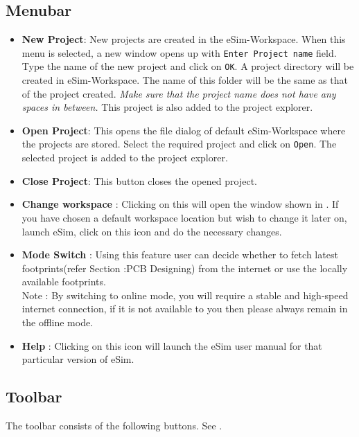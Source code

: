 \subsection{Menubar}
\begin{itemize}
\item \textbf{New Project}:
New projects are created in the eSim-Workspace. When this menu is selected, 
a new window opens up with {\tt Enter Project name} field. Type the name of 
the new project and click on {\tt OK}. A project directory will be created in 
eSim-Workspace. The name of this folder will be the same as that of the 
project created. \textit {Make sure that the project name does not have 
any spaces in between.} This project is also added to the project explorer.

\item \textbf{Open Project}:
This opens the file dialog of default eSim-Workspace where the projects are stored. 
Select the required project and click on {\tt Open}. The selected project is added 
to the project explorer.

\item \textbf{Close Project}:
This button closes the opened project.

\item \textbf{Change workspace} : Clicking on this will open the window shown in . If you have chosen a default workspace location but wish to change it later on, launch eSim, click on this icon and do the necessary changes. 

\item \textbf{Mode Switch} : Using this feature user can decide whether to fetch latest footprints(refer Section :PCB Designing) from the internet or use the locally available footprints. \\
Note : By switching to online mode, you will require a stable and high-speed internet connection, if it is not available to you then please always remain in the offline mode.

\item \textbf{Help} : Clicking on this icon will launch the eSim user manual for that particular version of eSim. 
\end{itemize}

\subsection{Toolbar}
The toolbar consists of the following buttons. See .

